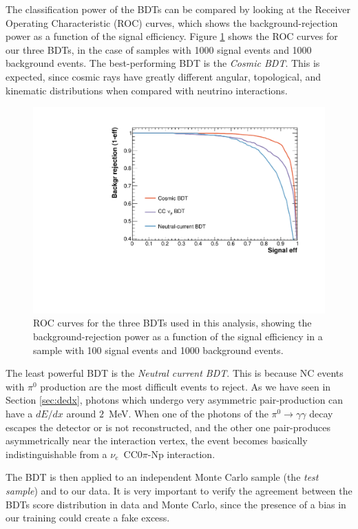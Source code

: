 The classification power of the BDTs can be compared by looking at the Receiver Operating Characteristic (ROC) curves, which shows the background-rejection power as a function of the signal efficiency. Figure \ref{fig:roc} shows the ROC curves for our three BDTs, in the case of samples with 1000 signal events and 1000 background events. The best-performing BDT is the \emph{Cosmic BDT}. This is expected, since cosmic rays have greatly different angular, topological, and kinematic distributions when compared with neutrino interactions. 

\begin{figure}[htbp]
\centering
  \includegraphics[width=0.75\linewidth]{figures/roc.pdf}
  \caption{ROC curves for the three BDTs used in this analysis, showing the background-rejection power as a function of the signal efficiency in a sample with 100 signal events and 1000 background events.}\label{fig:roc}
\end{figure}

The least powerful BDT is the \emph{Neutral current BDT}. This is because NC events with $\pi^0$ production are the most difficult events to reject. As we have seen in Section \ref{sec:dedx}, photons which undergo very asymmetric pair-production can have a $dE/dx$ around $2$~MeV. When one of the photons of the $\pi^0\rightarrow\gamma\gamma$ decay escapes the detector or is not reconstructed, and the other one pair-produces asymmetrically near the interaction vertex, the event becomes basically indistinguishable from a $\nu_e$~CC0$\pi$-Np interaction.

The BDT is then applied to an independent Monte Carlo sample (the \emph{test sample}) and to our data. It is very important to verify the agreement between the BDTs score distribution in data and Monte Carlo, since the presence of a bias in our training could create a fake excess.

